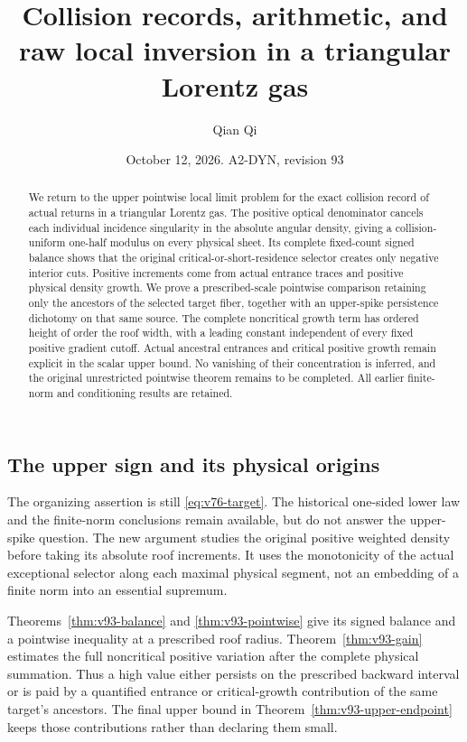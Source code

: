 \documentclass[11pt,reqno]{amsart}
\title[Collision records and raw local inversion]{Collision records, arithmetic, and raw local inversion in a triangular Lorentz gas}
\author{Qian Qi}
\date{October 12, 2026. A2-DYN, revision 93}
\numberwithin{equation}{section}
\theoremstyle{definition}
\theoremstyle{remark}\newtheorem{remark}[theorem]{Remark}
\begin{document}
\raggedbottom
\begin{abstract}
We return to the upper pointwise local limit problem for the exact
collision record of actual returns in a triangular Lorentz gas.
The positive optical denominator cancels each individual incidence
singularity in the absolute angular density, giving a collision-uniform
one-half modulus on every physical sheet. Its complete fixed-count
signed balance shows that the original critical-or-short-residence
selector creates only negative interior cuts. Positive increments come
from actual entrance traces and positive physical density growth.
We prove a prescribed-scale pointwise comparison retaining only the
ancestors of the selected target fiber, together with an upper-spike
persistence dichotomy on that same source. The complete noncritical
growth term has ordered height of order the roof width, with a leading
constant independent of every fixed positive gradient cutoff. Actual
ancestral entrances and critical positive growth remain explicit in
the scalar upper bound. No vanishing of their concentration is inferred,
and the original unrestricted pointwise theorem remains to be completed.
All earlier finite-norm and conditioning results are retained.
\end{abstract}
\maketitle


\subsection{The upper sign and its physical origins}
The organizing assertion is still \eqref{eq:v76-target}. The historical
one-sided lower law and the finite-norm conclusions remain available,
but do not answer the upper-spike question. The new argument studies
the original positive weighted density before taking its absolute
roof increments. It uses the monotonicity of the actual exceptional
selector along each maximal physical segment, not an embedding of a
finite norm into an essential supremum.

Theorems~\ref{thm:v93-balance} and \ref{thm:v93-pointwise} give its
signed balance and a pointwise inequality at a prescribed roof radius.
Theorem~\ref{thm:v93-gain} estimates the full noncritical positive
variation after the complete physical summation. Thus a high value
either persists on the prescribed backward interval or is paid by a
quantified entrance or critical-growth contribution of the same target's
ancestors. The final upper bound in Theorem~\ref{thm:v93-upper-endpoint}
keeps those contributions rather than declaring them small.
\end{document}
